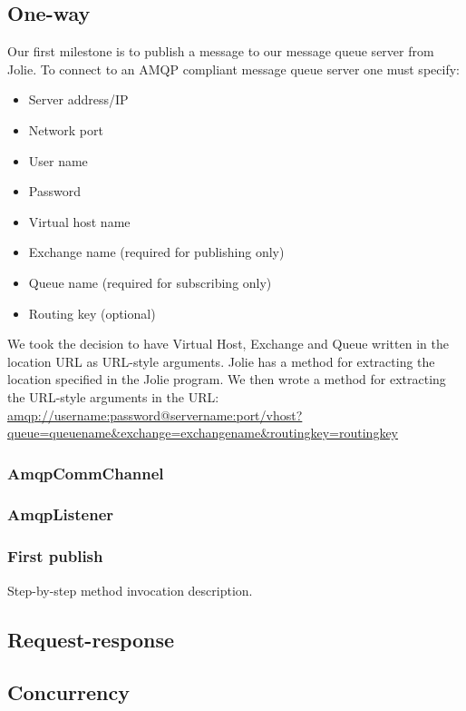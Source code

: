 \subsection{One-way}
Our first milestone is to publish a message to our message queue server from Jolie. To connect to an AMQP compliant message queue server one must specify:
\begin{itemize}
\item Server address/IP
\item Network port
\item User name
\item Password
\item Virtual host name
\item Exchange name (required for publishing only)
\item Queue name (required for subscribing only)
\item Routing key (optional)
\end{itemize}
We took the decision to have Virtual Host, Exchange and Queue written in the location URL as URL-style arguments. Jolie has a method for extracting the location specified in the Jolie program. We then wrote a method for extracting the URL-style arguments in the URL:\\
\url{amqp://username:password@servername:port/vhost?queue=queuename&exchange=exchangename&routingkey=routingkey}
\subsubsection{AmqpCommChannel}

\subsubsection{AmqpListener}
\subsubsection{First publish}
Step-by-step method invocation description.
\subsection{Request-response}
\subsection{Concurrency}
\newpage
